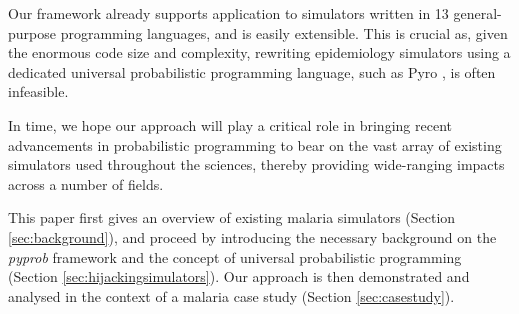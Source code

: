 \documentclass{article}
\begin{document}
Our framework already supports application to simulators written in 13 general-purpose programming languages, and is easily extensible. This is crucial as, given the enormous code size and complexity, rewriting epidemiology simulators using a dedicated universal probabilistic programming language, such as Pyro \cite{bingham2019pyro}, is often infeasible.

In time, we hope our approach will play a critical role in
bringing recent advancements in probabilistic programming to bear on
the vast array of existing simulators used throughout the sciences,
thereby providing wide-ranging impacts across a number of fields.

This paper first gives an overview of existing malaria simulators (Section \ref{sec:background}), and proceed by introducing the necessary background on the \textit{pyprob} framework and the concept of universal probabilistic programming (Section \ref{sec:hijackingsimulators}). Our approach is then demonstrated and analysed in the context of a malaria case study (Section \ref{sec:casestudy}). 





\end{document}
